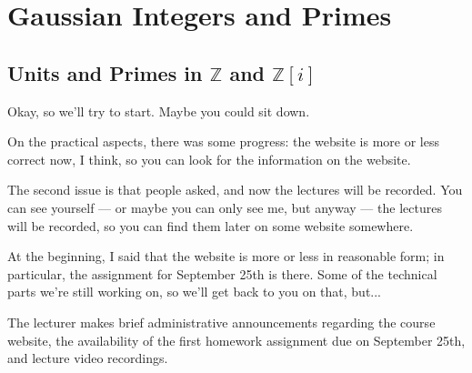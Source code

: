 \section{Gaussian Integers and Primes}
\subsection{Units and Primes in \texorpdfstring{$\mathbb{Z}$}{Z} and \texorpdfstring{$\mathbb{Z}[i]$}{Z[i]}}

\begin{speech}[00:00:00 - 00:00:53]
Okay, so we'll try to start. Maybe you could sit down.

On the practical aspects, there was some progress: the website is more or less correct now, I think, so you can look for the information on the website.

The second issue is that people asked, and now the lectures will be recorded. You can see yourself --- or maybe you can only see me, but anyway --- the lectures will be recorded, so you can find them later on some website somewhere.

At the beginning, I said that the website is more or less in reasonable form; in particular, the assignment for September 25th is there. Some of the technical parts we're still working on, so we'll get back to you on that, but...
\end{speech}

\begin{note}
The lecturer makes brief administrative announcements regarding the course website, the availability of the first homework assignment due on September 25th, and lecture video recordings.
\end{note}

